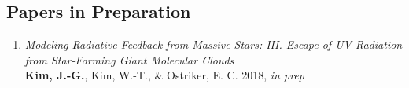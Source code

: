 \subsection{Papers in Preparation}
\begin{enumerate}
\item[] \textit{Modeling Radiative Feedback from Massive Stars: III.
    Escape of UV Radiation from Star-Forming
    Giant Molecular Clouds} \\
  \textbf{Kim, J.-G.}, Kim, W.-T., \& Ostriker, E. C. 2018, \textit{in
    prep}
\end{enumerate}

